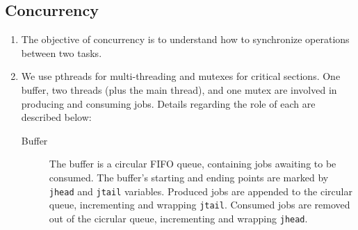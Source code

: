 \documentclass[letterpaper,10pt]{article}
\begin{document}
\subsection{Concurrency}
\begin{enumerate}
\item The objective of concurrency is to understand how to synchronize operations between two tasks.
\item We use pthreads for multi-threading and mutexes for critical sections. One buffer, two threads (plus the main thread), and one mutex are involved in producing and consuming jobs. Details regarding the role of each are described below:
\begin{description}
\item[Buffer] The buffer is a circular FIFO queue, containing jobs awaiting to be consumed. The buffer's starting and ending points are marked by \texttt{jhead} and \texttt{jtail} variables. Produced jobs are appended to the circular queue, incrementing and wrapping \texttt{jtail}. Consumed jobs are removed out of the cicrular queue, incrementing and wrapping \texttt{jhead}.


\end{description}
\end{enumerate}
\end{document}
